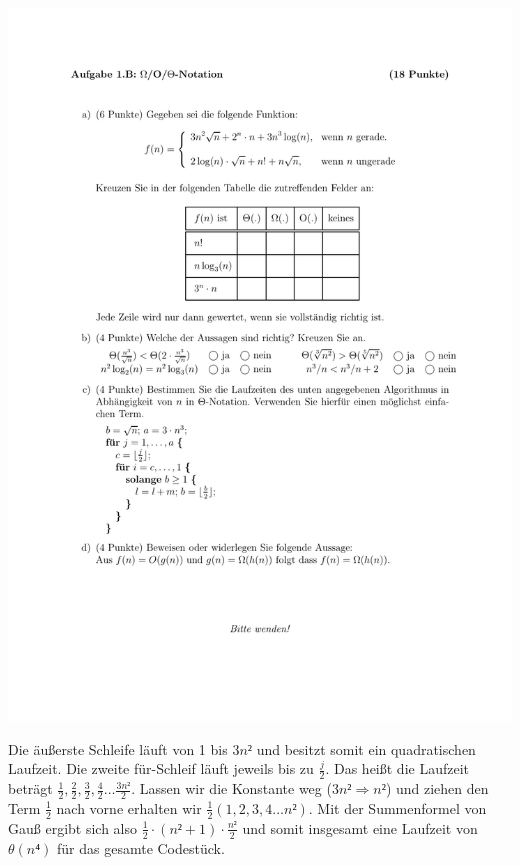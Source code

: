 \documentclass[a4paper, 12pt]{article}
\begin{document}
\begin{minipage}[t]{0.45\textwidth}
    \centering
    \includegraphics{Figures/Test_2007-11-16_1Bc}
    \label{figure:Test_2007-11-16_1Bc}
\end{minipage}

Die äußerste Schleife läuft von 1 bis $3n²$ und besitzt somit ein
quadratischen Laufzeit. Die zweite für-Schleif läuft jeweils bis zu
$\frac{j}{2}$. Das heißt die Laufzeit beträgt
$\frac{1}{2},\frac{2}{2},\frac{3}{2},\frac{4}{2}\dots\frac{3n²}{2}$. Lassen
wir die Konstante weg ($3n² ⇒ n²$) und ziehen den Term $\frac{1}{2}$ nach
vorne erhalten wir $\frac{1}{2}\left(1,2,3,4\dots n²\right)$. Mit der
Summenformel von Gauß ergibt sich also $\frac{1}{2}⋅(n²+1)⋅\frac{n²}{2}$ und
somit insgesamt eine Laufzeit von $θ\left(n⁴\right)$ für das gesamte
Codestück.\\
\end{document}
